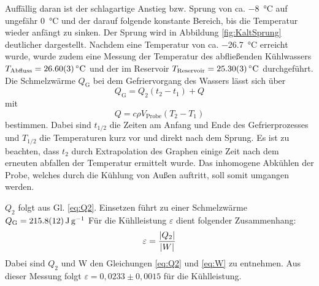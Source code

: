 	Auffällig daran ist der schlagartige Anstieg bzw. Sprung von ca. \SI{-8}{\celsius} auf ungefähr \SI{0}{\celsius} und der darauf folgende konstante Bereich, bis die Temperatur wieder anfängt zu sinken.
	Der Sprung wird in Abbildung \ref{fig:KaltSprung} deutlicher dargestellt.
	Nachdem eine Temperatur  von ca. \SI{-26,7}{\celsius} erreicht wurde, wurde zudem eine Messung der Temperatur des abfließenden Kühlwassers $T_\text{Abfluss} = \SI{26,6+-0,03}{\celsius}$ und der im Reservoir $T_\text{Reservoir} = \SI{25,3+-0,03}{\celsius}$ durchgeführt.
	Die Schmelzwärme $Q_\text{G}$ bei dem Gefriervorgang des Wassers lässt sich über 
	\begin{equation} %
		Q_\text{G} = Q_2 (t_2 - t_1) + Q
	\end{equation} %
	mit
	\begin{equation} \label{eq:Q} %
		Q = c \rho V_\text{Probe} (T_2 - T_1)
	\end{equation} %
	bestimmen.
	Dabei sind $t_{1/2}$ die Zeiten am Anfang und Ende des Gefrierprozesses und $T_{1/2}$ die Temperaturen kurz vor und direkt nach dem Sprung.
	Es ist zu beachten, dass $t_2$ durch Extrapolation des Graphen einige Zeit nach dem erneuten abfallen der Temperatur ermittelt wurde.
	Das inhomogene Abkühlen der Probe, welches durch die Kühlung von Außen auftritt, soll somit umgangen werden.
	
	$Q_2$ folgt aus Gl. \ref{eq:Q2}.
	Einsetzen führt zu einer Schmelzwärme $Q_\text{G} = \SI{215.8+-1.2}{\joule\per\gram}$ 
	Für die Kühlleistung $\varepsilon$ dient folgender Zusammenhang:
	\begin{equation} \label{eq:eps} %
		\varepsilon = \frac{\abs{Q_2}}{\abs{W}}
	\end{equation} %
	Dabei sind $Q_2$ und W den Gleichungen \ref{eq:Q2} und \ref{eq:W} zu entnehmen.
	Aus dieser Messung folgt $\varepsilon = 0,0233\pm 0,0015$ für die Kühlleistung.
	

